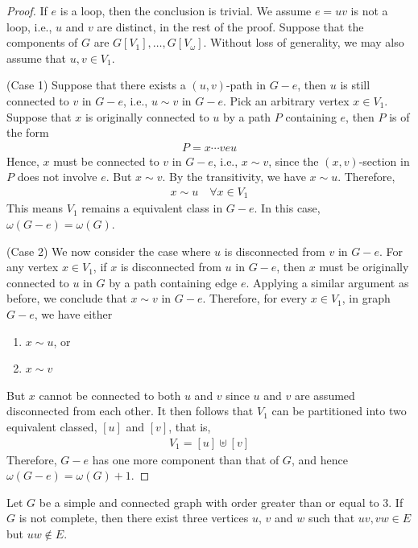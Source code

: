 \documentclass[thmcnt=section, 12pt, color=cyan]{my-elegantbook}
\begin{document}
\begin{proof}
	If $e$ is a loop, then the conclusion is trivial. 
	We assume $e = uv$ is not a loop, i.e., 
	$u$ and  $v$ are distinct,
	in the rest of the proof. 
	Suppose that the components of $G$
	are  $G[V_1], \ldots, G[V_\omega]$.
	Without loss of generality, 
	we may also assume that $u, v \in V_1$.

	(Case 1) Suppose that there exists a $(u,v)$-path in $G-e$,
	then $u$ is still connected to $v$ in $G-e$,
	i.e., $u \sim v$ in $G-e$.
	Pick an arbitrary vertex $x \in V_1$.
	Suppose that $x$ is originally connected to $u$ 
	by a path $P$ containing $e$,
	then $P$ is of the form 
	\begin{align*}
	    P = x \cdots v e u
	\end{align*}
	Hence, $x$ must be connected to $v$ in $G-e$,
	i.e., $x \sim v$, 
	since the $(x,v)$-section 
	in $P$ does not involve  $e$.
	But $x \sim v$. 
	By the transitivity, we have $x \sim u$. 
	Therefore, 
	\begin{align*}
		x \sim u 
		\quad \forall x \in V_1
	\end{align*}
	This means $V_1$ remains a equivalent class in  $G-e$.
	In this case,  $\omega(G-e) = \omega(G)$.

	(Case 2) We now consider the case where 
	$u$ is disconnected from  $v$ in $G-e$.
	For any vertex $x \in V_1$,
	if $x$ is disconnected from $u$ in  $G-e$, 
	then $x$ must be originally connected to $u$ in $G$ 
	by a path containing edge $e$.
	Applying a similar argument as before,
	we conclude that $x \sim v$ in $G-e$.
	Therefore, for every  $x \in V_1$, 
	in graph $G-e$, we have either 
	\begin{enumerate}
		\item $x \sim u$, or 
		\item $x \sim v$
	\end{enumerate}
	But $x$ cannot be connected to both  $u$ and  $v$
	since  $u$ and  $v$ are 
	assumed disconnected from each other.
	It then follows that  $V_1$ can be partitioned into
	two equivalent classed, $[u]$ and  $[v]$, that is, 
	\begin{align*}
		V_1 = [u] \uplus [v]
	\end{align*}
	Therefore, $G-e$ has one more component than that of $G$, 
	and hence  $\omega(G-e) = \omega(G) + 1$.
\end{proof}


\begin{proposition} \label{pro:7}
	Let $G$ be a simple and connected graph
	with order greater than or equal to 3.
	If $G$ is not complete,
	then there exist three vertices $u$, $v$ and $w$ such that 
	$uv, vw \in E$ but $uw \notin E$.
\end{proposition}
\end{document}
